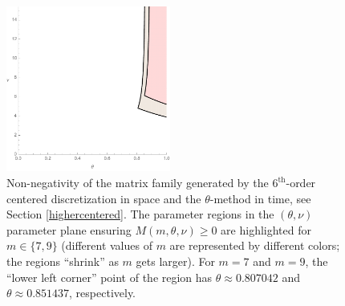 \documentclass[a4paper]{article}
\newcommand{\te}{\theta}
\begin{document}
\begin{figure}
\begin{center}
\includegraphics[width=0.48\textwidth]{fig_7stencilm79.pdf}
\caption{Non-negativity of the matrix family generated by the $6^\text{th}$-order centered discretization in space and the $\theta$-method in time, see Section \ref{highercentered}. The parameter regions in the $(\te,\nu)$ parameter plane ensuring $M(m,\te,\nu)\ge 0$ are highlighted for $m\in\{7, 9\}$ (different values of $m$ are represented by different colors; the regions ``shrink'' as $m$ gets larger). For $m=7$ and $m=9$, the ``lower left corner'' point of the region has $\theta\approx 0.807042$ and $\theta\approx 0.851437$, respectively.}\label{fig_7stencilm79}
\end{center}
\end{figure}
\end{document}
